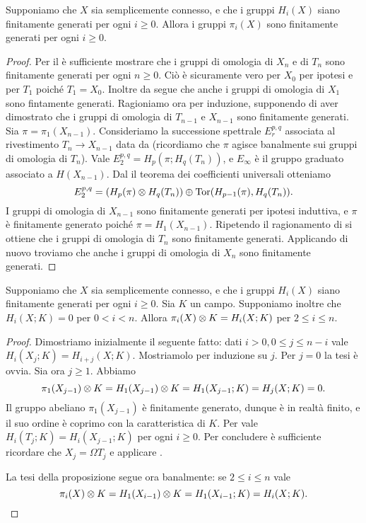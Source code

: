 \begin{proposition}
Supponiamo che $X$ sia semplicemente connesso, e che i gruppi $H_i(X)$ siano finitamente generati per ogni $i\ge 0$. Allora i gruppi $\pi_i(X)$ sono finitamente generati per ogni $i\ge 0$.
\end{proposition}
\begin{proof}
Per il  è sufficiente mostrare che i gruppi di omologia di $X_n$ e di $T_n$ sono finitamente generati per ogni $n\ge 0$. Ciò è sicuramente vero per $X_0$ per ipotesi e per $T_1$ poiché $T_1=X_0$. Inoltre da \missing{} segue che anche i gruppi di omologia di $X_1$ sono fintamente generati. Ragioniamo ora per induzione, supponendo di aver dimostrato che i gruppi di omologia di $T_{n-1}$ e $X_{n-1}$ sono finitamente generati. Sia $\pi=\pi_1(X_{n-1})$. Consideriamo la successione spettrale $E^{p,q}_r$ associata al rivestimento $T_n\to X_{n-1}$ data da \missing{} (ricordiamo che $\pi$ agisce banalmente sui gruppi di omologia di $T_n$). Vale $E^{p,q}_2=H_p(\pi;H_q(T_n))$, e $E_\infty$ è il gruppo graduato associato a $H(X_{n-1})$. Dal il teorema dei coefficienti universali otteniamo
$$
E^{p,q}_2=(H_p(\pi)\mathbin{\otimes} H_q(T_n))\mathbin{\oplus}\operatorname{Tor}(H_{p-1}(\pi),H_q(T_n)).
$$
I gruppi di omologia di $X_{n-1}$ sono finitamente generati per ipotesi induttiva, e $\pi$ è finitamente generato poiché $\pi=H_1(X_{n-1})$. \mistery{} %
Ripetendo il ragionamento di \missing{} si ottiene che i gruppi di omologia di $T_n$ sono finitamente generati. Applicando di nuovo \missing{} troviamo che anche i gruppi di omologia di $X_n$ sono finitamente generati.
\end{proof}

\begin{proposition}
Supponiamo che $X$ sia semplicemente connesso, e che i gruppi $H_i(X)$ siano finitamente generati per ogni $i\ge 0$. Sia $K$ un campo. Supponiamo inoltre che $H_i(X;K)=0$ per $0<i<n$. Allora $\pi_i(X)\mathbin{\otimes} K=H_i(X;K)$ per $2\le i\le n$.
\end{proposition}
\begin{proof}
Dimostriamo inizialmente il seguente fatto: dati $i>0,0\le j\le n-i$ vale $H_i(X_j;K)=H_{i+j}(X;K)$.
Mostriamolo per induzione su $j$. Per $j=0$ la tesi è ovvia. Sia ora $j\ge 1$. Abbiamo 
$$
\pi_1(X_{j-1})\mathbin{\otimes} K=H_1(X_{j-1})\mathbin{\otimes} K=H_1(X_{j-1};K)=H_j(X;K)=0.
$$
Il gruppo abeliano $\pi_1(X_{j-1})$ è finitamente generato, dunque è in realtà finito, e il suo ordine è coprimo con la caratteristica di $K$. Per \missing{} vale $H_i(T_j;K)=H_i(X_{j-1};K)$ per ogni $i\ge 0$. Per concludere è sufficiente ricordare che $X_j=\Omega T_j$ e applicare \missing{}.

La tesi della proposizione segue ora banalmente: se $2\le i\le n$ vale
$$
\pi_i(X)\mathbin{\otimes} K=H_1(X_{i-1})\mathbin{\otimes} K=H_1(X_{i-1};K)=H_i(X;K).
$$
\end{proof}

